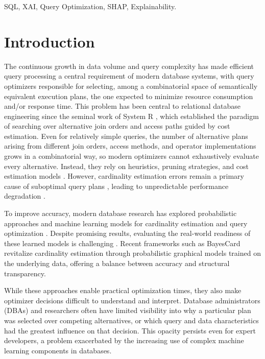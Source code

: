 \documentclass[conference]{IEEEtran}
\begin{document}
\begin{IEEEkeywords}
SQL, XAI, Query Optimization, SHAP, Explainability.
\end{IEEEkeywords}

\section{Introduction}

The continuous growth in data volume and query complexity has made efficient query processing a central requirement of modern database systems, with query optimizers responsible for selecting, among a combinatorial space of semantically equivalent execution plans, the one expected to minimize resource consumption and/or response time. This problem has been central to relational database engineering since the seminal work of System R \cite{b1}, which established the paradigm of searching over alternative join orders and access paths guided by cost estimation. Even for relatively simple queries, the number of alternative plans arising from different join orders, access methods, and operator implementations grows in a combinatorial way, so modern optimizers cannot exhaustively evaluate every alternative. Instead, they rely on heuristics, pruning strategies, and cost estimation models \cite{b2,b3}. However, cardinality estimation errors remain a primary cause of suboptimal query plans \cite{b4}, leading to unpredictable performance degradation \cite{b5}.

To improve accuracy, modern database research has explored probabilistic approaches \cite{b6} and machine learning models for cardinality estimation \cite{b7} and query optimization \cite{b8}. Despite promising results, evaluating the real-world readiness of these learned models is challenging \cite{b9}. Recent frameworks such as BayesCard \cite{b10} revitalize cardinality estimation through probabilistic graphical models trained on the underlying data, offering a balance between accuracy and structural transparency.

While these approaches enable practical optimization times, they also make optimizer decisions difficult to understand and interpret. Database administrators (DBAs) and researchers often have limited visibility into why a particular plan was selected over competing alternatives, or which query and data characteristics had the greatest influence on that decision. This opacity persists even for expert developers, a problem exacerbated by the increasing use of complex machine learning components in databases.
\end{document}
